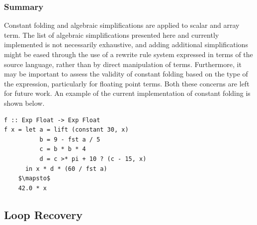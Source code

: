\subsubsection{Summary}

Constant folding and algebraic simplifications are applied to scalar and array
term. The list of algebraic simplifications presented here and currently
implemented is not necessarily exhaustive, and adding additional simplifications
might be eased through the use of a rewrite rule system expressed in terms of
the source language, rather than by direct manipulation of 
terms. Furthermore, it may be important to assess the validity of constant
folding based on the type of the expression, particularly for floating point
terms. Both these concerns are left for future work. An example of the current
implementation of constant folding is shown below.

\begin{lstlisting}[style=Haskell,mathescape,caption={Example of constant expression evaluation}]
f :: Exp Float -> Exp Float
f x = let a = lift (constant 30, x)
          b = 9 - fst a / 5
          c = b * b * 4
          d = c >* pi + 10 ? (c - 15, x)
      in x * d * (60 / fst a)
    $\mapsto$
    42.0 * x
\end{lstlisting}


\subsection{Loop Recovery}


